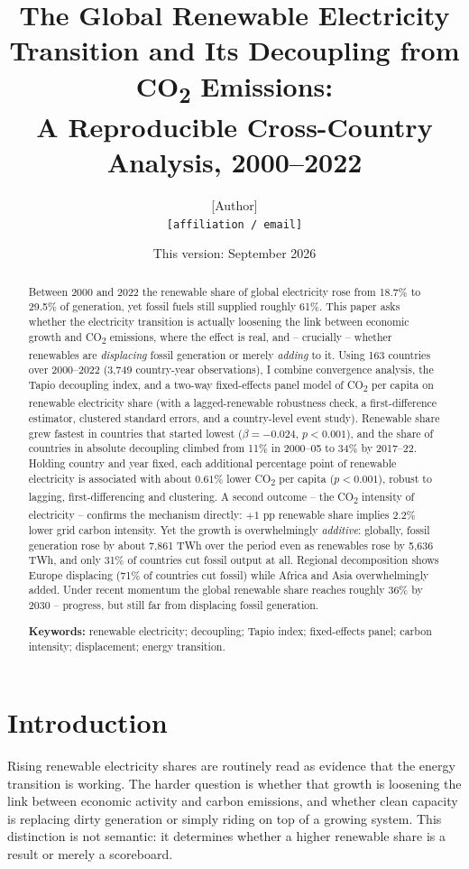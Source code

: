\documentclass[11pt]{article}
\title{The Global Renewable Electricity Transition and Its Decoupling from CO\textsubscript{2} Emissions:\\
A Reproducible Cross-Country Analysis, 2000--2022}
\author{[Author] \\ \texttt{[affiliation / email]}}
\date{This version: September 2026}
\begin{document}
\maketitle
\begin{abstract}
Between 2000 and 2022 the renewable share of global electricity rose from 18.7\% to 29.5\% of generation, yet fossil fuels still supplied roughly 61\%. This paper asks whether the electricity transition is actually loosening the link between economic growth and CO\textsubscript{2} emissions, where the effect is real, and -- crucially -- whether renewables are \emph{displacing} fossil generation or merely \emph{adding} to it. Using 163 countries over 2000--2022 (3,749 country-year observations), I combine convergence analysis, the Tapio decoupling index, and a two-way fixed-effects panel model of CO\textsubscript{2} per capita on renewable electricity share (with a lagged-renewable robustness check, a first-difference estimator, clustered standard errors, and a country-level event study). Renewable share grew fastest in countries that started lowest ($\beta=-0.024$, $p<0.001$), and the share of countries in absolute decoupling climbed from 11\% in 2000--05 to 34\% by 2017--22. Holding country and year fixed, each additional percentage point of renewable electricity is associated with about $0.61\%$ lower CO\textsubscript{2} per capita ($p<0.001$), robust to lagging, first-differencing and clustering. A second outcome -- the CO\textsubscript{2} intensity of electricity -- confirms the mechanism directly: $+1$ pp renewable share implies $2.2\%$ lower grid carbon intensity. Yet the growth is overwhelmingly \emph{additive}: globally, fossil generation rose by about 7,861 TWh over the period even as renewables rose by 5,636 TWh, and only 31\% of countries cut fossil output at all. Regional decomposition shows Europe displacing (71\% of countries cut fossil) while Africa and Asia overwhelmingly added. Under recent momentum the global renewable share reaches roughly 36\% by 2030 -- progress, but still far from displacing fossil generation.

\noindent\textbf{Keywords:} renewable electricity; decoupling; Tapio index; fixed-effects panel; carbon intensity; displacement; energy transition.
\end{abstract}

\section{Introduction}
Rising renewable electricity shares are routinely read as evidence that the energy transition is working. The harder question is whether that growth is loosening the link between economic activity and carbon emissions, and whether clean capacity is replacing dirty generation or simply riding on top of a growing system. This distinction is not semantic: it determines whether a higher renewable share is a result or merely a scoreboard.
\end{document}

